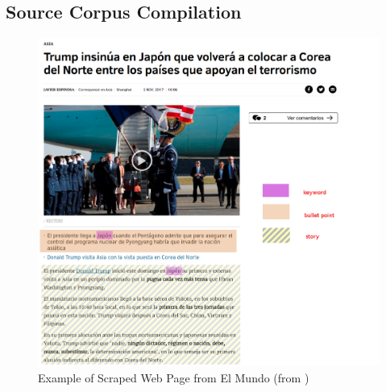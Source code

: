 \documentclass[]{article}
\begin{document}
\subsection{Source Corpus Compilation}

\begin{center}
	\begin{figure}
		\includegraphics[width=\linewidth]{media/article.png}
		\caption{Example of Scraped Web Page from El Mundo (from \cite{elmundosample})}
		\label{fig:article}
	\end{figure}
\end{center}
\end{document}
